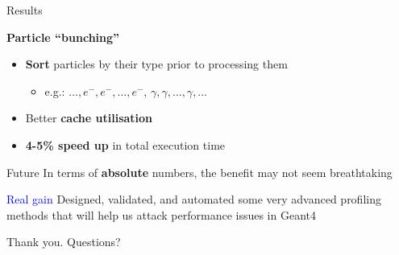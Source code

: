 \documentclass{beamer}
\begin{document}
\begin{frame}{Results}

{\bf Particle ``bunching''}
\begin{itemize}
\item {\bf Sort} particles by their type prior to processing them
\begin{itemize}
\item e.g.: $\ldots, e^-, e^-, \ldots, e^-$, $\gamma, \gamma, \ldots, \gamma, \ldots$
\end{itemize}
\item Better {\bf cache utilisation}
\item {\bf 4-5\% speed up} in total execution time
\end{itemize}
\end{frame}

\begin{frame}{Future}
In terms of {\bf absolute} numbers, the benefit may not seem breathtaking

\vspace{5mm}

\textcolor{blue}{Real gain} Designed, validated, and automated some very advanced profiling methods that will help us attack performance issues in Geant4
\end{frame}

\begin{frame}
\begin{center}
Thank you. Questions?
\end{center}
\end{frame}
\end{document}
